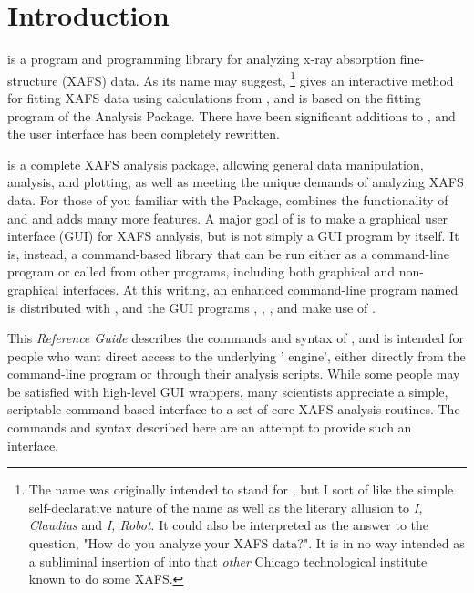 \section{Introduction} \label{Ch:intro}

{\ifeffit} is a program and programming library for analyzing x-ray
absorption fine-structure (XAFS) data.  As its name may suggest,
{\ifeffit}{\footnote{The name was originally intended to stand for
    {} {\feffit}, but I sort of like the simple
    self-declarative nature of the name as well as the literary allusion to
    {\textsl{I, Claudius}} and {\textsl{I, Robot}}.  It could also be
    interpreted as the answer to the question, "How do you analyze your
    XAFS data?".  It is in no way intended as a subliminal insertion of
    {\feff} into that {\emph{other}} Chicago technological institute known
    to do some XAFS.}}  
gives an interactive method for fitting XAFS data using calculations from
{\feff}, and is based on the fitting program {\feffit} of the {\uwxafs}
Analysis Package.  There have been significant additions to {\feffit}, and
the user interface has been completely rewritten.

{\ifeffit} is a complete XAFS analysis package, allowing general data
manipulation, analysis, and plotting, as well as meeting the unique demands
of analyzing XAFS data.  For those of you familiar with the {\uwxafs}
Package, {\ifeffit} combines the functionality of {\autobk} and {\feffit}
and adds many more features.  A major goal of {\ifeffit} is to make a
graphical user interface (GUI) for XAFS analysis, but {\ifeffit} is not
simply a GUI program by itself.  It is, instead, a command-based library
that can be run either as a command-line program or called from other
programs, including both graphical and non-graphical interfaces.  At this
writing, an enhanced command-line program named {\gifeffit} is distributed
with {\ifeffit}, and the GUI programs {},
{}, {}, and {} make use
of {\ifeffit}.

This {\textsl{Reference Guide}} describes the commands and syntax of
{\ifeffit}, and is intended for people who want direct access to the
underlying '{\ifeffit} engine', either directly from the command-line
program or through their analysis scripts.  While some people may be
satisfied with high-level GUI wrappers, many scientists appreciate a
simple, scriptable command-based interface to a set of core XAFS analysis
routines.  The commands and syntax described here are an attempt to provide
such an interface.

